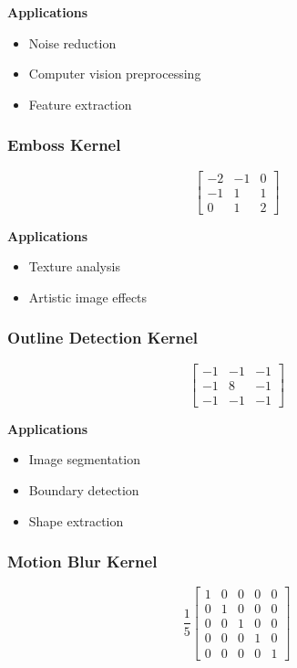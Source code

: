 \documentclass[12pt,a4paper]{article}
\begin{document}
\textbf{Applications}

\begin{itemize}
    \item Noise reduction
    \item Computer vision preprocessing
    \item Feature extraction
\end{itemize}

\subsubsection{Emboss Kernel}

\[
\begin{bmatrix}
-2&-1&0\\
-1&1&1\\
0&1&2
\end{bmatrix}
\]

\textbf{Applications}

\begin{itemize}
    \item Texture analysis
    \item Artistic image effects
\end{itemize}

\subsubsection{Outline Detection Kernel}

\[
\begin{bmatrix}
-1&-1&-1\\
-1&8&-1\\
-1&-1&-1
\end{bmatrix}
\]

\textbf{Applications}

\begin{itemize}
    \item Image segmentation
    \item Boundary detection
    \item Shape extraction
\end{itemize}

\subsubsection{Motion Blur Kernel}

\[
\frac{1}{5}
\begin{bmatrix}
1&0&0&0&0\\
0&1&0&0&0\\
0&0&1&0&0\\
0&0&0&1&0\\
0&0&0&0&1
\end{bmatrix}
\]
\end{document}
